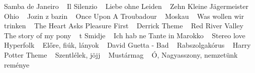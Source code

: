 \footnotesize Samba de Janeiro \ \textbf{\pageref{eJaneiro}} \newline
\footnotesize Il Silenzio \ \textbf{\pageref{nzio}} \newline
\footnotesize Liebe ohne Leiden \ \textbf{\pageref{hneLeiden}} \newline
\footnotesize Zehn Kleine Jägermeister \ \textbf{\pageref{eineJC3A4germeister}} \newline
\footnotesize Ohio \ \textbf{\pageref{}} \newline
\footnotesize Jozin z bazin \ \textbf{\pageref{bazin}} \newline
\footnotesize Once Upon A Troubadour \ \textbf{\pageref{onATroubadour}} \newline
\footnotesize Moskau \ \textbf{\pageref{}} \newline
\footnotesize Was wollen wir trinken \ \textbf{\pageref{lenwirtrinken}} \newline
\footnotesize The Heart Asks Pleasure First \ \textbf{\pageref{rtAsksPleasureFirst}} \newline
\footnotesize Derrick Theme \ \textbf{\pageref{Theme}} \newline
\footnotesize Red River Valley \ \textbf{\pageref{erValley}} \newline
\footnotesize The story of my pony \ \textbf{\pageref{ryofmypony}} \newline
\footnotesize t Smidje \ \textbf{\pageref{e}} \newline
\footnotesize Ich hab ne Tante in Marokko \ \textbf{\pageref{neTanteinMarokko}} \newline
\footnotesize Stereo love \ \textbf{\pageref{love}} \newline
\footnotesize Hyperfolk \ \textbf{\pageref{lk}} \newline
\footnotesize Előre, fiúk, lányok \ \textbf{\pageref{1re2CfiC3BAk2ClC3A1nyok}} \newline
\footnotesize David Guetta - Bad \ \textbf{\pageref{uetta-Bad}} \newline
\footnotesize Rabszolgakórus \ \textbf{\pageref{gakC3B3rus}} \newline
\footnotesize Harry Potter Theme \ \textbf{\pageref{otterTheme}} \newline
\footnotesize Szentlélek, jöjj \ \textbf{\pageref{C3A9lek2CjC3B6jj}} \newline
\footnotesize Mustármag \ \textbf{\pageref{A1rmag}} \newline
\footnotesize Ó, Nagyasszony, nemzetünk reménye \ \textbf{\pageref{Nagyasszony2CnemzetC3BCnkremC3A9nye}} \newline
